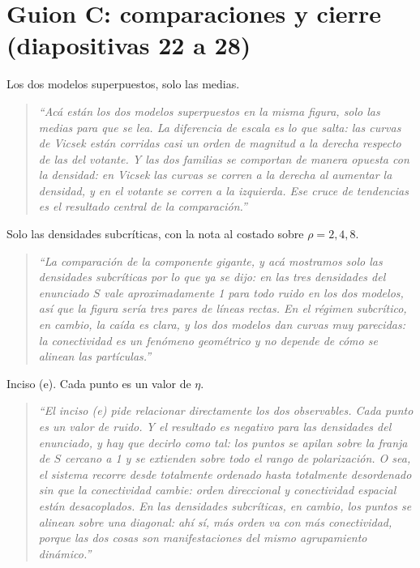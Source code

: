 \documentclass[11pt]{article}
\begin{document}
\section{Guion C: comparaciones y cierre (diapositivas 22 a 28)}


Los dos modelos superpuestos, solo las medias.

\begin{quote}
\itshape
``Acá están los dos modelos superpuestos en la misma figura, solo las medias
para que se lea. La diferencia de escala es lo que salta: las curvas de Vicsek
están corridas casi un orden de magnitud a la derecha respecto de las del
votante. Y las dos familias se comportan de manera opuesta con la densidad: en
Vicsek las curvas se corren a la derecha al aumentar la densidad, y en el
votante se corren a la izquierda. Ese cruce de tendencias es el resultado
central de la comparación.''
\end{quote}


Solo las densidades subcríticas, con la nota al costado sobre $\rho = 2, 4, 8$.

\begin{quote}
\itshape
``La comparación de la componente gigante, y acá mostramos solo las densidades
subcríticas por lo que ya se dijo: en las tres densidades del enunciado $S$ vale
aproximadamente 1 para todo ruido en los dos modelos, así que la figura sería
tres pares de líneas rectas. En el régimen subcrítico, en cambio, la caída es
clara, y los dos modelos dan curvas muy parecidas: la conectividad es un
fenómeno geométrico y no depende de cómo se alinean las partículas.''
\end{quote}


Inciso (e). Cada punto es un valor de $\eta$.

\begin{quote}
\itshape
``El inciso (e) pide relacionar directamente los dos observables. Cada punto es
un valor de ruido. Y el resultado es negativo para las densidades del enunciado,
y hay que decirlo como tal: los puntos se apilan sobre la franja de $S$ cercano
a 1 y se extienden sobre todo el rango de polarización. O sea, el sistema
recorre desde totalmente ordenado hasta totalmente desordenado sin que la
conectividad cambie: orden direccional y conectividad espacial están
desacoplados. En las densidades subcríticas, en cambio, los puntos se alinean
sobre una diagonal: ahí sí, más orden va con más conectividad, porque las dos
cosas son manifestaciones del mismo agrupamiento dinámico.''
\end{quote}
\end{document}
